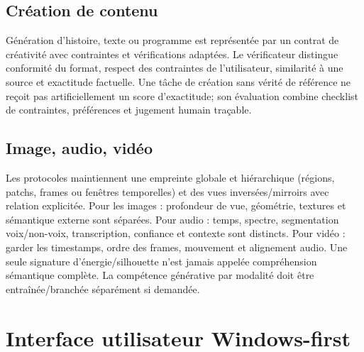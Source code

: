 \documentclass[11pt,a4paper,oneside]{report}
\begin{document}
\section{Création de contenu}
Génération d'histoire, texte ou programme est représentée par un contrat de créativité avec contraintes et vérifications adaptées. Le vérificateur distingue conformité du format, respect des contraintes de l'utilisateur, similarité à une source et exactitude factuelle. Une tâche de création sans vérité de référence ne reçoit pas artificiellement un score d'exactitude; son évaluation combine checklist de contraintes, préférences et jugement humain traçable.

\section{Image, audio, vidéo}
Les protocoles maintiennent une empreinte globale et hiérarchique (régions, patchs, frames ou fenêtres temporelles) et des vues inversées/mirroirs avec relation explicitée. Pour les images : profondeur de vue, géométrie, textures et sémantique externe sont séparées. Pour audio : temps, spectre, segmentation voix/non-voix, transcription, confiance et contexte sont distincts. Pour vidéo : garder les timestamps, ordre des frames, mouvement et alignement audio. Une seule signature d'énergie/silhouette n'est jamais appelée compréhension sémantique complète. La compétence générative par modalité doit être entraînée/branchée séparément si demandée.

\chapter{Interface utilisateur Windows-first}
\end{document}
